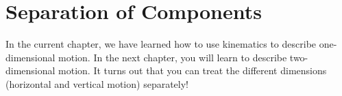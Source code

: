 \begin{Answer}[ref = graphs]

\end{Answer}


\section{Separation of Components}
In the current chapter, we have learned how to use kinematics to describe 
one-dimensional motion. In the next chapter, you will learn to describe 
two-dimensional motion. It turns out that you can treat the different dimensions 
(horizontal and vertical motion) separately! 

